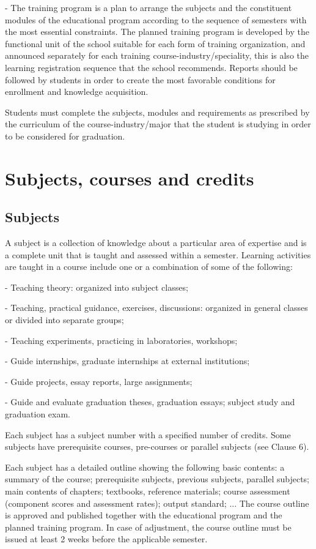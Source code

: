 - The training program is a plan to arrange the subjects and the constituent modules of the educational program according to the sequence of semesters with the most essential constraints. The planned training program is developed by the functional unit of the school suitable for each form of training organization, and announced separately for each training course-industry/speciality, this is also the learning registration sequence that the school recommends. Reports should be followed by students in order to create the most favorable conditions for enrollment and knowledge acquisition.

Students must complete the subjects, modules and requirements as prescribed by the curriculum of the course-industry/major that the student is studying in order to be considered for graduation.

\section{Subjects, courses and credits}
\subsection{Subjects}
A subject is a collection of knowledge about a particular area of expertise and is a complete unit that is taught and assessed within a semester. Learning activities are taught in a course include one or a combination of some of the following:

- Teaching theory: organized into subject classes;

- Teaching, practical guidance, exercises, discussions: organized in general classes or divided into separate groups;

- Teaching experiments, practicing in laboratories, workshops;

- Guide internships, graduate internships at external institutions;

- Guide projects, essay reports, large assignments;

- Guide and evaluate graduation theses, graduation essays; subject study and graduation exam.

Each subject has a subject number with a specified number of credits. Some subjects have prerequisite courses, pre-courses or parallel subjects (see Clause 6).

Each subject has a detailed outline showing the following basic contents: a summary of the course; prerequisite subjects, previous subjects, parallel subjects; main contents of chapters; textbooks, reference materials; course assessment (component scores and assessment rates); output standard; ... The course outline is approved and published together with the educational program and the planned training program. In case of adjustment, the course outline must be issued at least 2 weeks before the applicable semester.

